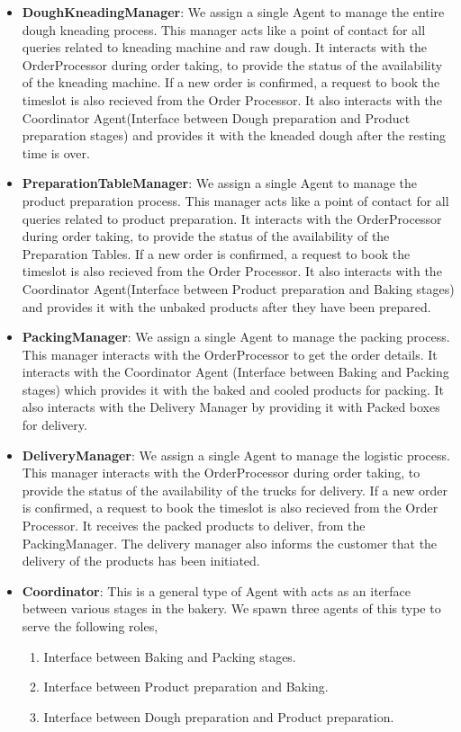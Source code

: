 \documentclass[12pt]{article}
\begin{document}
\begin{itemize}
    \item \textbf{DoughKneadingManager}: We assign a single Agent to manage the entire dough kneading process. This manager acts like a point of contact for all queries related to kneading machine and raw dough. It interacts with the OrderProcessor during order taking, to provide the status of the availability of the kneading machine. If a new order is confirmed, a request to book the timeslot is also recieved from the Order Processor. It also interacts with the Coordinator Agent(Interface between Dough preparation and Product preparation stages) and provides it with the kneaded dough after the resting time is over.
    \item \textbf{PreparationTableManager}: We assign a single Agent to manage the product preparation process. This manager acts like a point of contact for all queries related to product preparation. It interacts with the OrderProcessor during order taking, to provide the status of the availability of the Preparation Tables. If a new order is confirmed, a request to book the timeslot is also recieved from the Order Processor. It also interacts with the Coordinator Agent(Interface between Product preparation and Baking stages) and provides it with the unbaked products after they have been prepared.
    \item \textbf{PackingManager}: We assign a single Agent to manage the packing process. This manager interacts with the OrderProcessor to get the order details. It interacts with the Coordinator Agent (Interface between Baking and Packing stages) which provides it with the baked and cooled products for packing. It also interacts with the Delivery Manager by providing it with Packed boxes for delivery.
    \item \textbf{DeliveryManager}: We assign a single Agent to manage the logistic process. This manager interacts with the OrderProcessor during order taking, to provide the status of the availability of the trucks for delivery. If a new order is confirmed, a request to book the timeslot is also recieved from the Order Processor. It receives the packed products to deliver, from the PackingManager. The delivery manager also informs the customer that the delivery of the products has been initiated.
    \item \textbf{Coordinator}: This is a general type of Agent with acts as an iterface between various stages in the bakery. We spawn three agents of this type to serve the following roles,
    \begin{enumerate}
    \item Interface between Baking and Packing stages.
    \item Interface between Product preparation and Baking.
    \item Interface between Dough preparation and Product preparation.
    \end{enumerate}
\end{itemize}
\end{document}
